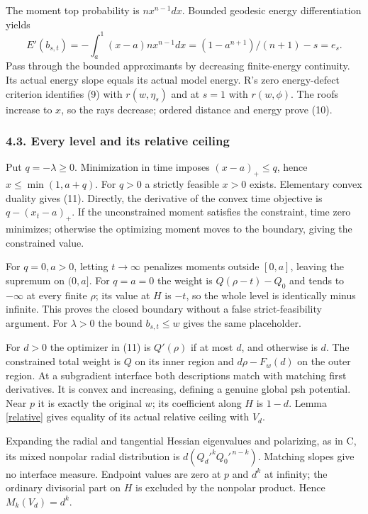 \documentclass[
  11pt,
]{article}
\begin{document}
The moment top probability is \(n x^{n-1}dx\). Bounded geodesic energy
differentiation yields \[
E'(b_{s,t})=-\int_a^1(x-a)n x^{n-1}dx
=(1-a^{n+1})/(n+1)-s=e_s.
\tag{15}
\] Pass through the bounded approximants by decreasing finite-energy
continuity. Its actual energy slope equals its actual model energy. R's
zero energy-defect criterion identifies (9) with \(r(w,\eta_s)\) and at
\(s=1\) with \(r(w,\phi)\). The roofs increase to \(x\), so the rays
decrease; ordered distance and energy prove (10).

\subsubsection{4.3. Every level and its relative
ceiling}\label{every-level-and-its-relative-ceiling}

Put \(q=-\lambda\ge0\). Minimization in time imposes \((x-a)_+\le q\),
hence \(x\le\min(1,a+q)\). For \(q>0\) a strictly feasible \(x>0\)
exists. Elementary convex duality gives (11). Directly, the derivative
of the convex time objective is \(q-(x_t-a)_+\). If the unconstrained
moment satisfies the constraint, time zero minimizes; otherwise the
optimizing moment moves to the boundary, giving the constrained value.

For \(q=0,a>0\), letting \(t\to\infty\) penalizes moments outside
\([0,a]\), leaving the supremum on \((0,a]\). For \(q=a=0\) the weight
is \(Q(\rho-t)-Q_0\) and tends to \(-\infty\) at every finite \(\rho\);
its value at \(H\) is \(-t\), so the whole level is identically minus
infinite. This proves the closed boundary without a false
strict-feasibility argument. For \(\lambda>0\) the bound
\(b_{s,t}\le w\) gives the same placeholder.

For \(d>0\) the optimizer in (11) is \(Q'(\rho)\) if at most \(d\), and
otherwise is \(d\). The constrained total weight is \(Q\) on its inner
region and \(d\rho-F_w(d)\) on the outer region. At a subgradient
interface both descriptions match with matching first derivatives. It is
convex and increasing, defining a genuine global psh potential. Near
\(p\) it is exactly the original \(w\); its coefficient along \(H\) is
\(1-d\). Lemma \ref{relative} gives equality of its actual relative
ceiling with \(V_d\).

Expanding the radial and tangential Hessian eigenvalues and polarizing,
as in C, its mixed nonpolar radial distribution is
\(d(Q_d'^kQ_0'^{\,n-k})\). Matching slopes give no interface measure.
Endpoint values are zero at \(p\) and \(d^k\) at infinity; the ordinary
divisorial part on \(H\) is excluded by the nonpolar product. Hence
\(M_k(V_d)=d^k\).
\end{document}
